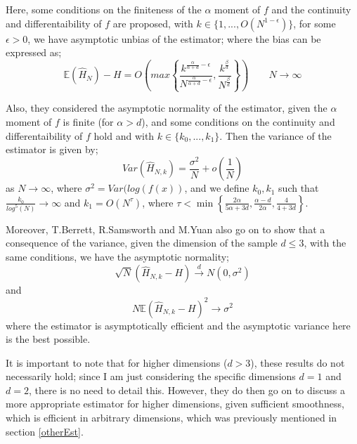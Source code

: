 \documentclass{report}
\begin{document}
Here, some conditions on the finiteness of the $\alpha$ moment of $f$ and the continuity and differentaibility of $f$ are proposed, with $k \in \{1, ..., O(N^{1-\epsilon})\}$, for some $\epsilon > 0$, we have asymptotic unbias of the estimator; where the bias can be expressed as;
\begin{equation}
\mathbb{E} ( \hat{H}_{N} ) - H = O \left( max \left\{ \frac{k^{\frac{\alpha}{\alpha + d} - \epsilon}}{N^{\frac{\alpha}{\alpha + d} - \epsilon}}, \frac{k^{\frac{\beta}{d}}}{N^{\frac{\beta}{d}}} \right\} \right) \quad \quad N \to \infty
\end{equation}

Also, they considered the asymptotic normality of the estimator, given the $\alpha$ moment of $f$ is finite (for $\alpha > d$), and some conditions on the continuity and differentaibility of $f$ hold and with $k \in \{k_{0}, ..., k_{1}\}$. Then the variance of the estimator is given by;
\begin{equation}
Var(\hat{H}_{N, k}) = \frac{\sigma^2}{N} + o(\frac{1}{N})
\end{equation}
as $N \to \infty$, where $\sigma^2 = Var(log(f(x))$, and we define $k_{0}, k_{1}$ such that $\frac{k_{0}}{log^5(N)} \to \infty$ and $k_{1} = O(N^{\tau})$, where $\tau < \min \left\{ \frac{2 \alpha}{5 \alpha + 3d} , \frac{\alpha - d}{2 \alpha} , \frac{4}{4 + 3d} \right\}$. 

Moreover, T.Berrett, R.Samsworth and M.Yuan also go on to show that a consequence of the variance, given the dimension of the sample $d \leq 3$, with the same conditions, we have the asymptotic normality;
\begin{equation}
\sqrt{N}(\hat{H}_{N, k} - H) \xrightarrow{d} N(0, \sigma^2)
\end{equation}
and 
\begin{equation} 
N \mathbb{E}{(\hat{H}_{N, k} - H)^2} \xrightarrow{} \sigma^2
\end{equation}
where the estimator is asymptotically efficient and the asymptotic variance here is the best possible.

It is important to note that for higher dimensions ($d > 3$), these results do not necessarily hold; since I am just considering the specific dimensions $d=1$ and $d=2$, there is no need to detail this. However, they do then go on to discuss a more appropriate estimator for higher dimensions, given sufficient smoothness, which is efficient in arbitrary dimensions, which was previously mentioned in section \ref{otherEst}.
\end{document}
